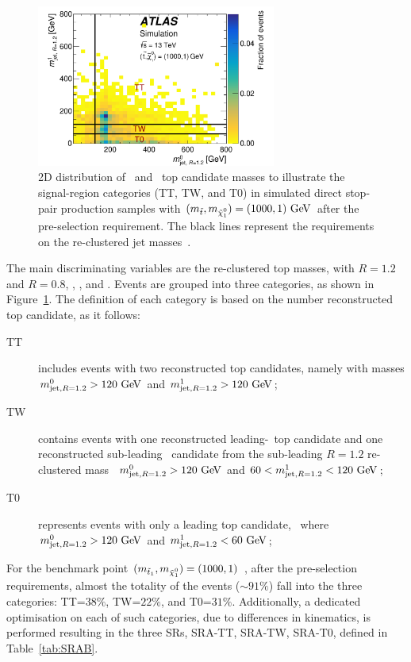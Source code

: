 				\begin{figure}[!htb]
				  \begin{center}
				   \includegraphics[width=0.7\textwidth]{figures/stop/SRA/CategoryDefs}
				   \caption{2D distribution of \mantikttwelvezero\ and \mantikttwelveone\ top candidate masses to illustrate the signal-region categories (TT, TW, and T0) in simulated direct stop-pair production samples with $(m_{\stop},m_{\ninoone})=(1000,1) \GeV$ after the pre-selection requirement. The black lines represent the requirements on the re-clustered jet masses~\cite{stop0L}.}
				   \label{fig:categories}
				  \end{center}
				\end{figure}

				The main discriminating variables are the re-clustered top masses, with $R = 1.2$ and $R = 0.8$, \mtbmin, \drbb, and \met. Events are grouped into three categories, as shown in Figure~\ref{fig:categories}. The definition of each category is based on the number reconstructed top candidate, as it follows: 
				
				\begin{description}
					\item[TT] includes events with two reconstructed top candidates, namely with masses $\mantikttwelvezero>120\gev$ and $\mantikttwelveone>120\gev$;
					\item[TW] contains events with one reconstructed leading-\pt\ top candidate and one reconstructed sub-leading \Wboson\ candidate from the sub-leading $R = 1.2$ re-clustered mass \ie\ $\mantikttwelvezero>120\gev$ and $60<\mantikttwelveone<120\gev$;
					\item[T0] represents events with only a leading top candidate, \ie\ where $\mantikttwelvezero>120\gev$ and $\mantikttwelveone<60\gev$;
				\end{description}

				\noindent For the benchmark point $(\mstopone, \mninoone) = (1000,1)$ \GeV, after the pre-selection requirements, almost the totality of the events ($\sim 91\%$) fall into the three categories: TT=$38\%$, TW=$22\%$, and T0=$31\%$. Additionally, a  dedicated optimisation on each of such categories, due to differences in kinematics, is performed resulting in the three \acp{SR}, SRA-TT, SRA-TW, SRA-T0, defined in Table~\ref{tab:SRAB}. %
				
